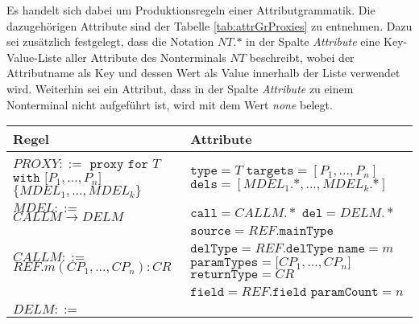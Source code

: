 \noindent
Es handelt sich dabei um Produktionsregeln einer Attributgrammatik. Die dazugehörigen Attribute sind der Tabelle \ref{tab:attrGrProxies} zu entnehmen. Dazu sei zusätzlich festgelegt, dass die Notation $\mathit{NT}\texttt{.}\text{*}$ in der Spalte \emph{Attribute} eine Key-Value-Liste aller Attribute des Nonterminals $\mathit{NT}$ beschreibt, wobei der Attributname als Key und dessen Wert als Value innerhalb der Liste verwendet wird. Weiterhin sei ein Attribut, dass in der Spalte \emph{Attribute} zu einem Nonterminal nicht aufgeführt ist, wird mit dem Wert \emph{none} belegt.
\begin{table}[h!]
\centering
\begin{tabular}{|p{6cm}|p{8cm}|}
\hline
\hline
\centering\textbf{Regel} & \textbf{Attribute} \\
\hline
\hline
$\mathit{PROXY} ::=$\newline
$\texttt{proxy } \texttt{for } T$\newline
$ \texttt{with [}\mathit{P_1},...,\mathit{P_n}\texttt{]}$ \newline
$\texttt{\{}\mathit{MDEL_1},...,\mathit{MDEL_k} \texttt{\}}$
& 
$\texttt{type} = \mathit{T}$\newline
$\texttt{targets} = [\mathit{P_1},...,\mathit{P_n}]$\newline
$\texttt{dels} = [\mathit{MDEL_1}\texttt{.}\text{*},...,\mathit{MDEL_k}\texttt{.}\text{*}]$
\\
\hline
$\mathit{MDEL} ::=$\newline
$\mathit{CALLM} \rightarrow \mathit{DELM} $  
& 
$\texttt{call} = \mathit{CALLM}.*$\newline
$\texttt{del} = \mathit{DELM}.*$
\\
\hline
$\mathit{CALLM} ::=$\newline 
$\mathit{REF}.\mathit{m(\mathit{CP_1},...,\mathit{CP_n}):CR}$
& 
$\texttt{source} = \mathit{REF.\texttt{mainType}}$\newline
$\texttt{delType} = \mathit{REF.\texttt{delType}}$\newline
$\texttt{name} = \mathit{m}$\newline
$\texttt{paramTypes} = \mathit{[CP_1},...,\mathit{CP_n]}$\newline
$\texttt{returnType} = \mathit{CR}$\newline
$\texttt{field} = \mathit{REF}\texttt{.field}$\newline
$\texttt{paramCount} = n$
\\
\hline
$\mathit{DELM} ::=$\newline 

\end{tabular}
\end{table}

